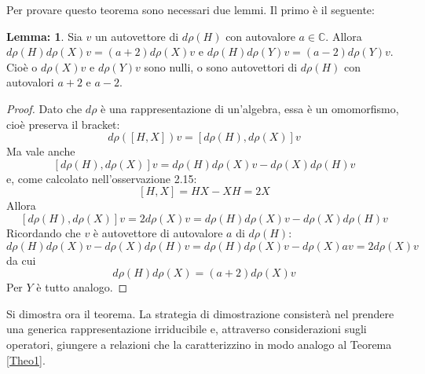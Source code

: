 \documentclass[12pt,a4paper]{report}
\theoremstyle{definition}
\theoremstyle{definition}
\theoremstyle{definition}
\newtheorem{Lem}[Def]{Lemma:}
\theoremstyle{remark}
\begin{document}
Per provare questo teorema sono necessari due lemmi. Il primo  è il seguente:
\begin{Lem}\label{Lemma1}
	Sia $v$ un autovettore di $d\rho(H)$ con autovalore $a\in\mathbb{C}$. Allora $d\rho(H)d\rho(X)v=(a+2)d\rho(X)v$ e $d\rho(H)d\rho(Y)v=(a-2)d\rho(Y)v$. Cioè o $d\rho(X)v$ e $d\rho(Y)v$ sono nulli, o sono autovettori di $d\rho(H)$ con autovalori $a+2$ e $a-2$.
\end{Lem}
\begin{proof}
	Dato che $d\rho$ è una rappresentazione di un'algebra, essa è un omomorfismo, cioè preserva il bracket:\\ $$d\rho([H,X])v=[d\rho(H),d\rho(X)]v$$
	Ma vale anche $$[d\rho(H),d\rho(X)]v=d\rho(H)d\rho(X)v-d\rho(X)d\rho(H)v$$ e, come calcolato nell'osservazione 2.15: $$[H,X]=HX-XH=2X$$ 
	Allora $$[d\rho(H),d\rho(X)]v=2d\rho(X)v=d\rho(H)d\rho(X)v-d\rho(X)d\rho(H)v$$ 
	Ricordando che $v$ è autovettore di autovalore $a$ di $d\rho(H)$:
	$$d\rho(H)d\rho(X)v-d\rho(X)d\rho(H)v=d\rho(H)d\rho(X)v-d\rho(X)av=2d\rho(X)v$$ da cui
	$$d\rho(H)d\rho(X)=(a+2)d\rho(X)v$$ 
	Per $Y$ è tutto analogo.
\end{proof}
Si dimostra ora il teorema. La strategia di dimostrazione consisterà nel prendere una generica rappresentazione irriducibile e, attraverso considerazioni sugli operatori, giungere a relazioni che la caratterizzino in modo analogo al Teorema \ref{Theo1}.
\end{document}
